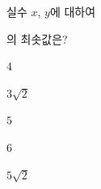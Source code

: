 실수 $x$, $y$에 대하여\par\smallskip{}\par\smallskip\noindent 의 최솟값은?
\begin{choices32}{\rule[-3ex]{0pt}{8ex}$4$}{\rule[-3ex]{0pt}{8ex}$3\sqrt{2}$}{\rule[-3ex]{0pt}{8ex}$5$}{\rule[-3ex]{0pt}{8ex}$6$}{\rule[-3ex]{0pt}{8ex}$5\sqrt{2}$}\end{choices32}
